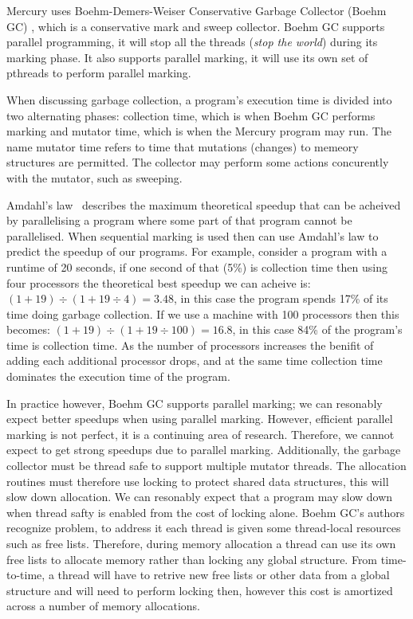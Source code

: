 Mercury uses Boehm-Demers-Weiser Conservative Garbage Collector (Boehm GC)
\citep{boehm_gc},
which is a conservative mark and sweep collector.
Boehm GC supports parallel programming,
it will stop all the threads (\emph{stop the world}) during its marking
phase.
It also supports parallel marking,
it will use its own set of pthreads to perform parallel marking.

When discussing garbage collection,
a program's execution time is divided into two alternating phases:
collection time, which is when Boehm GC performs marking
and mutator time, which is when the Mercury program may run.
The name mutator time refers to time that mutations (changes) to memeory
structures are permitted.
The collector may perform some actions concurently with the mutator,
such as sweeping.

Amdahl's law~\citep{amdahl} describes the maximum theoretical speedup that
can be acheived by parallelising a program where some part of that program
cannot be parallelised.
When sequential marking is used then can use Amdahl's
law to predict the speedup of our programs.
For example, consider a program with a runtime of 20 seconds,
if one second of that (5\%) is collection time
then using four processors the theoretical best speedup we can acheive is:
$(1 + 19) \div (1 + 19\div4) = 3.48$,
in this case the program spends 17\% of its time doing garbage collection.
If we use a machine with 100 processors then this becomes:
$(1 + 19) \div (1 + 19\div100) = 16.8$,
in this case 84\% of the program's time is collection time.
As the number of processors increases the benifit of adding each additional
processor drops,
and at the same time collection time dominates the execution time of the
program.

In practice however,
Boehm GC supports parallel marking;
we can resonably expect better speedups when using parallel marking.
However,
efficient parallel marking is not perfect,
it is a continuing area of research.
Therefore,
we cannot expect to get strong speedups due to parallel marking.
Additionally,
the garbage collector must be thread safe to support multiple mutator
threads.
The allocation routines must therefore use locking to protect shared data
structures,
this will slow down allocation.
We can resonably expect that a program may slow down when thread safty is
enabled from the cost of locking alone.
Boehm GC's authors recognize problem,
to address it each thread is given some thread-local resources such as free
lists.
Therefore,
during memory allocation a thread can use its own free lists to allocate
memory rather than locking any global structure.
From time-to-time, a thread will have to retrive new free lists or other
data from a global structure and will need to perform locking then,
however this cost is amortized across a number of memory allocations.

